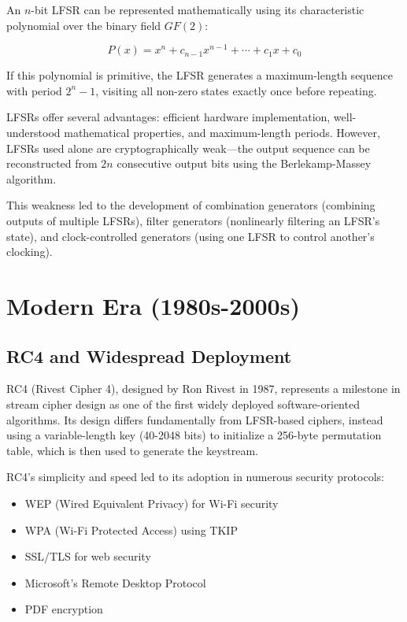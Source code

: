 \documentclass[12pt,a4paper,oneside]{report}
\begin{document}
An $n$-bit LFSR can be represented mathematically using its characteristic polynomial over the binary field $GF(2)$:

\begin{equation}
    P(x) = x^n + c_{n-1}x^{n-1} + \cdots + c_1x + c_0
\end{equation}

If this polynomial is primitive, the LFSR generates a maximum-length sequence with period $2^n - 1$, visiting all non-zero states exactly once before repeating.

LFSRs offer several advantages: efficient hardware implementation, well-understood mathematical properties, and maximum-length periods. However, LFSRs used alone are cryptographically weak—the output sequence can be reconstructed from $2n$ consecutive output bits using the Berlekamp-Massey algorithm.

This weakness led to the development of combination generators (combining outputs of multiple LFSRs), filter generators (nonlinearly filtering an LFSR's state), and clock-controlled generators (using one LFSR to control another's clocking).

\section{Modern Era (1980s-2000s)}
\label{sec:modern-era}

\subsection{RC4 and Widespread Deployment}

RC4 (Rivest Cipher 4), designed by Ron Rivest in 1987, represents a milestone in stream cipher design as one of the first widely deployed software-oriented algorithms. Its design differs fundamentally from LFSR-based ciphers, instead using a variable-length key (40-2048 bits) to initialize a 256-byte permutation table, which is then used to generate the keystream.

RC4's simplicity and speed led to its adoption in numerous security protocols:

\begin{itemize}
    \item WEP (Wired Equivalent Privacy) for Wi-Fi security
    \item WPA (Wi-Fi Protected Access) using TKIP
    \item SSL/TLS for web security
    \item Microsoft's Remote Desktop Protocol
    \item PDF encryption
\end{itemize}
\end{document}
